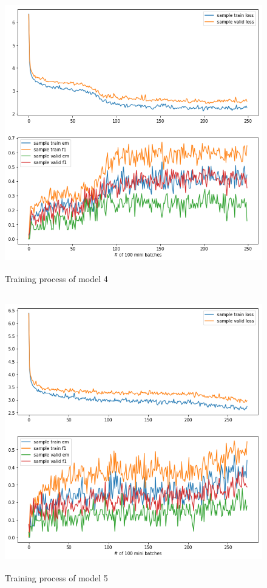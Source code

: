 \documentclass[modernstyle,12pt]{sjsuthesis}
\theoremstyle{definition}
\begin{document}
\begin{figure}[htbp]\centering
  \includegraphics[width=12cm, height=12cm]{figures/match_change2.png}
  \caption{Training process of model 4}
  \label{f:baseline_change2}
\end{figure}

\begin{figure}[htbp]\centering
  \includegraphics[width=12cm, height=12cm]{figures/match_change3.png}
  \caption{Training process of model 5}
  \label{f:baseline_change3}
\end{figure}
\end{document}
